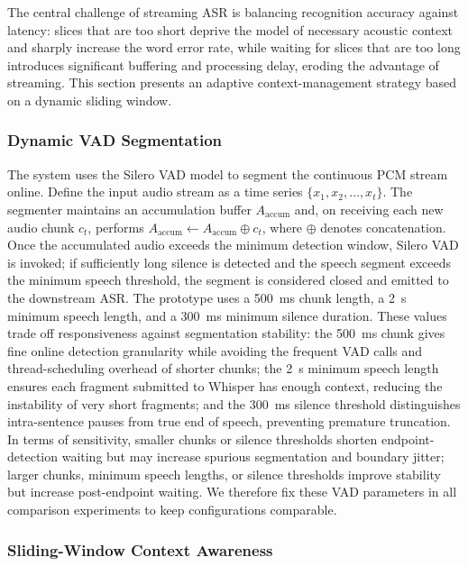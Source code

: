 \documentclass[conference]{IEEEtran}
\begin{document}
The central challenge of streaming ASR is balancing recognition accuracy against latency: slices that are too short deprive the model of necessary acoustic context and sharply increase the word error rate, while waiting for slices that are too long introduces significant buffering and processing delay, eroding the advantage of streaming. This section presents an adaptive context-management strategy based on a dynamic sliding window.

\subsubsection{Dynamic VAD Segmentation}

The system uses the Silero VAD model to segment the continuous PCM stream online. Define the input audio stream as a time series $\{x_1,x_2,\dots,x_t\}$. The segmenter maintains an accumulation buffer $A_{\mathrm{accum}}$ and, on receiving each new audio chunk $c_t$, performs $A_{\mathrm{accum}}\leftarrow A_{\mathrm{accum}}\oplus c_t$, where $\oplus$ denotes concatenation. Once the accumulated audio exceeds the minimum detection window, Silero VAD is invoked; if sufficiently long silence is detected and the speech segment exceeds the minimum speech threshold, the segment is considered closed and emitted to the downstream ASR. The prototype uses a 500~ms chunk length, a 2~s minimum speech length, and a 300~ms minimum silence duration. These values trade off responsiveness against segmentation stability: the 500~ms chunk gives fine online detection granularity while avoiding the frequent VAD calls and thread-scheduling overhead of shorter chunks; the 2~s minimum speech length ensures each fragment submitted to Whisper has enough context, reducing the instability of very short fragments; and the 300~ms silence threshold distinguishes intra-sentence pauses from true end of speech, preventing premature truncation. In terms of sensitivity, smaller chunks or silence thresholds shorten endpoint-detection waiting but may increase spurious segmentation and boundary jitter; larger chunks, minimum speech lengths, or silence thresholds improve stability but increase post-endpoint waiting. We therefore fix these VAD parameters in all comparison experiments to keep configurations comparable.

\subsubsection{Sliding-Window Context Awareness}
\end{document}
